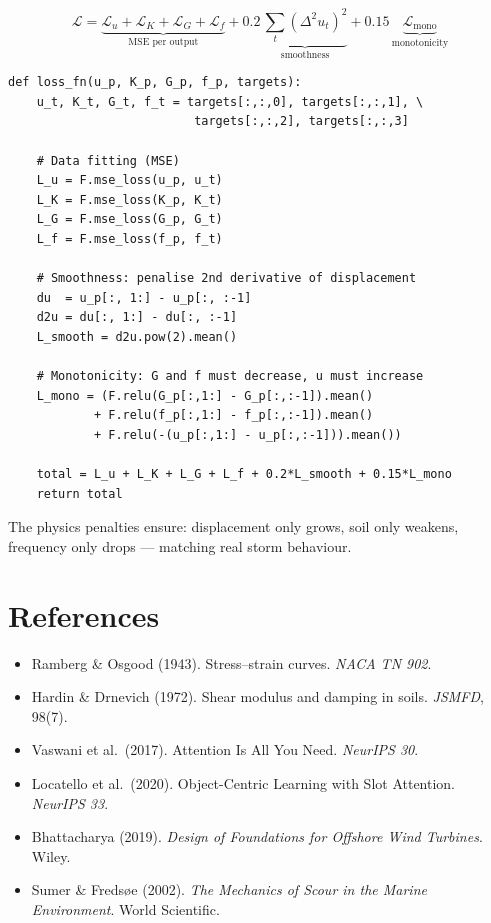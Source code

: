 \documentclass[12pt,a4paper]{article}
\begin{document}
\begin{equation}
  \mathcal{L} = \underbrace{\mathcal{L}_u + \mathcal{L}_K + \mathcal{L}_G + \mathcal{L}_f}_{\text{MSE per output}}
  + 0.2\,\underbrace{\sum_t (\Delta^2 u_t)^2}_{\text{smoothness}}
  + 0.15\,\underbrace{\mathcal{L}_\text{mono}}_{\text{monotonicity}}
\end{equation}

\begin{lstlisting}[caption={Physics-informed loss function.}]
def loss_fn(u_p, K_p, G_p, f_p, targets):
    u_t, K_t, G_t, f_t = targets[:,:,0], targets[:,:,1], \
                          targets[:,:,2], targets[:,:,3]

    # Data fitting (MSE)
    L_u = F.mse_loss(u_p, u_t)
    L_K = F.mse_loss(K_p, K_t)
    L_G = F.mse_loss(G_p, G_t)
    L_f = F.mse_loss(f_p, f_t)

    # Smoothness: penalise 2nd derivative of displacement
    du  = u_p[:, 1:] - u_p[:, :-1]
    d2u = du[:, 1:] - du[:, :-1]
    L_smooth = d2u.pow(2).mean()

    # Monotonicity: G and f must decrease, u must increase
    L_mono = (F.relu(G_p[:,1:] - G_p[:,:-1]).mean()
            + F.relu(f_p[:,1:] - f_p[:,:-1]).mean()
            + F.relu(-(u_p[:,1:] - u_p[:,:-1])).mean())

    total = L_u + L_K + L_G + L_f + 0.2*L_smooth + 0.15*L_mono
    return total
\end{lstlisting}

The physics penalties ensure: displacement only grows, soil only weakens, frequency only drops — matching real storm behaviour.

\section{References}
\begin{itemize}[nosep]
  \item Ramberg \& Osgood (1943). Stress–strain curves. \textit{NACA TN 902}.
  \item Hardin \& Drnevich (1972). Shear modulus and damping in soils. \textit{JSMFD}, 98(7).
  \item Vaswani et al.\ (2017). Attention Is All You Need. \textit{NeurIPS 30}.
  \item Locatello et al.\ (2020). Object-Centric Learning with Slot Attention. \textit{NeurIPS 33}.
  \item Bhattacharya (2019). \textit{Design of Foundations for Offshore Wind Turbines}. Wiley.
  \item Sumer \& Fredsøe (2002). \textit{The Mechanics of Scour in the Marine Environment}. World Scientific.
\end{itemize}
\end{document}
